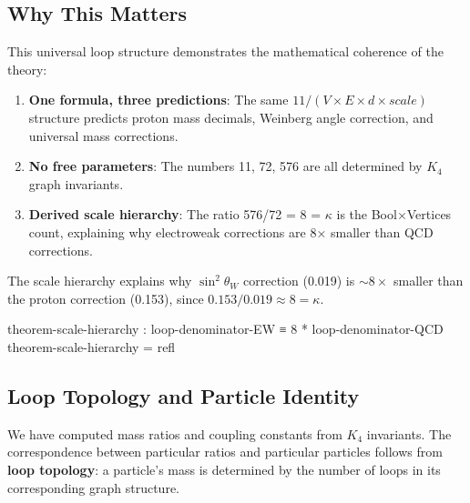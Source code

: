 \documentclass[11pt,a4paper]{book}
\def\text#1{#1}%
\begin{document}
\subsection{Why This Matters}

This universal loop structure demonstrates the mathematical coherence of the theory:

\begin{enumerate}
\item \textbf{One formula, three predictions}: The same $11/(V \times E \times d \times \text{scale})$ structure predicts proton mass decimals, Weinberg angle correction, and universal mass corrections.

\item \textbf{No free parameters}: The numbers 11, 72, 576 are all determined by $K_4$ graph invariants.

\item \textbf{Derived scale hierarchy}: The ratio 576/72 = 8 = $\kappa$ is the Bool$\times$Vertices count, explaining why electroweak corrections are 8× smaller than QCD corrections.
\end{enumerate}

The scale hierarchy explains why $\sin^2\theta_W$ correction (0.019) is $\sim 8\times$ smaller than the proton correction (0.153), since $0.153 / 0.019 \approx 8 = \kappa$.

\begin{code}
theorem-scale-hierarchy : loop-denominator-EW ≡ 8 * loop-denominator-QCD
theorem-scale-hierarchy = refl
\end{code}

\subsection{Loop Topology and Particle Identity}

We have computed mass ratios and coupling constants from $K_4$ invariants. The correspondence between particular ratios and particular particles follows from \textbf{loop topology}: a particle's mass is determined by the number of loops in its corresponding graph structure.
\end{document}
